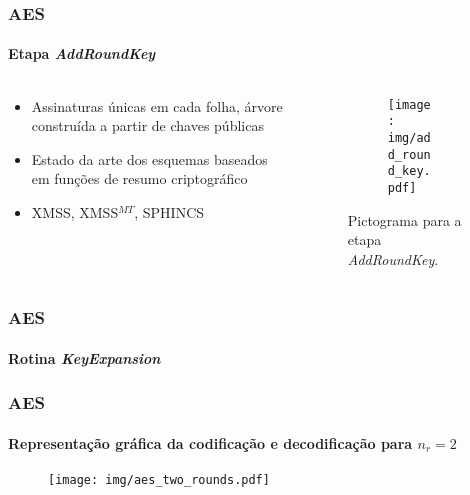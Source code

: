 \documentclass[12pt]{beamer}
\begin{document}
\begin{frame}
    \frametitle{AES}
    \framesubtitle{Etapa \emph{AddRoundKey}}
    \begin{columns}[T]
        \begin{column}{.7\textwidth}
          \begin{itemize}
            \item Assinaturas únicas em cada folha, árvore construída a partir de chaves públicas
            \item Estado da arte dos esquemas baseados em funções de resumo criptográfico
            \item XMSS, XMSS$^{MT}$, SPHINCS
          \end{itemize}
        \end{column}
        \begin{column}{.25\textwidth}
            \begin{figure}
            \centering
            \begin{subfigure}[b]{0.7\textwidth}
               \texttt{[image: img/add\_round\_key.pdf]}
               \vspace{2mm}
            \end{subfigure}
                    \captionsetup{font=scriptsize}
        
            \caption*{Pictograma para a etapa \emph{AddRoundKey}.}
            \end{figure}
        \end{column}
    \end{columns}
\end{frame}

\begin{frame}
    \frametitle{AES}
    \framesubtitle{Rotina \emph{KeyExpansion}}
\end{frame}

\begin{frame}
    \frametitle{AES}
    \framesubtitle{Representação gráfica da codificação e decodificação para $n_r = 2$}
    
    \begin{figure}
        \centering
        \texttt{[image: img/aes\_two\_rounds.pdf]}
        \label{fig:my_label}
    \end{figure}
\end{frame}
\end{document}
